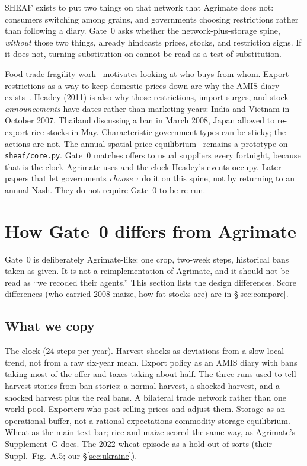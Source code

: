 \documentclass[11pt,a4paper]{article}
\begin{document}
SHEAF exists to put two things on that network that Agrimate does not:
consumers switching among grains, and governments choosing restrictions
rather than following a diary. Gate~0 asks whether the network-plus-storage
spine, \emph{without} those two things, already hindcasts prices, stocks,
and restriction signs. If it does not, turning substitution on cannot be
read as a test of substitution.

Food-trade fragility work~\citep{puma2015} motivates looking at who buys
from whom. Export restrictions as a way to keep domestic prices down are
why the AMIS diary exists~\citep{headey2011,martin2012,wright2011}.
Headey (2011) is also why those restrictions, import surges, and stock
\emph{announcements} have dates rather than marketing years: India and
Vietnam in October 2007, Thailand discussing a ban in March 2008, Japan
allowed to re-export rice stocks in May. Characteristic government types
can be sticky; the actions are not. The annual spatial price
equilibrium~\citep{enke1951,samuelson1952,takayama1971} remains a
prototype on \texttt{sheaf/core.py}. Gate~0 matches offers to usual
suppliers every fortnight, because that is the clock Agrimate uses and
the clock Headey's events occupy. Later papers that let governments
\emph{choose} $\tau$ do it on this spine, not by returning to an annual
Nash. They do not require Gate~0 to be re-run.

\section{How Gate~0 differs from Agrimate}
\label{sec:vs-agrimate}

Gate~0 is deliberately Agrimate-like: one crop, two-week steps, historical
bans taken as given. It is not a reimplementation of Agrimate, and it
should not be read as ``we recoded their agents.'' This section lists the
design differences. Score differences (who carried 2008 maize, how fat
stocks are) are in \S\ref{sec:compare}.

\subsection{What we copy}

The clock (24 steps per year). Harvest shocks as deviations from a slow
local trend, not from a raw six-year mean. Export policy as an AMIS diary
with bans taking most of the offer and taxes taking about half. The three
runs used to tell harvest stories from ban stories: a normal harvest, a
shocked harvest, and a shocked harvest plus the real bans. A bilateral
trade network rather than one world pool. Exporters who post selling
prices and adjust them. Storage as an operational buffer, not a
rational-expectations commodity-storage equilibrium. Wheat as the
main-text bar; rice and maize scored the same way, as Agrimate's
Supplement~G does. The 2022 wheat episode as a hold-out of sorts
(their Suppl.\ Fig.~A.5; our \S\ref{sec:ukraine}).
\end{document}
